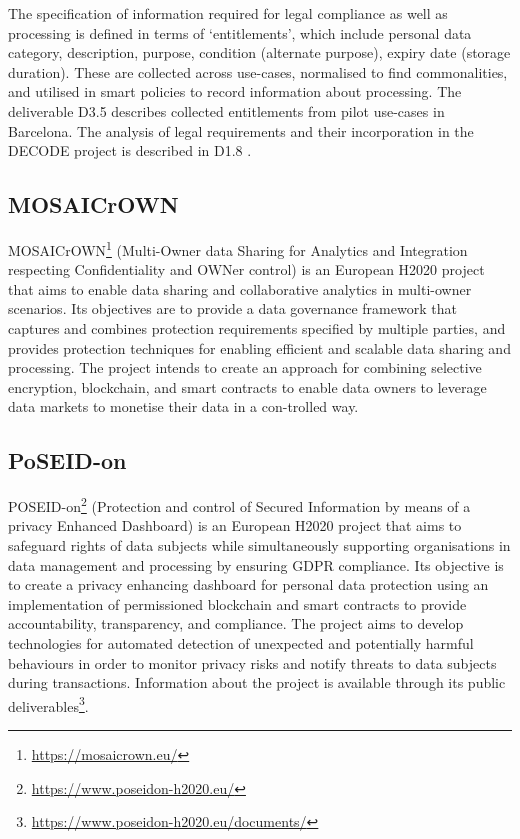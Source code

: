 The specification of information required for legal compliance as well as processing is defined in terms of `entitlements', which include personal data category, description, purpose, condition (alternate purpose), expiry date (storage duration). These are collected across use-cases, normalised to find commonalities, and utilised in smart policies to record information about processing. The deliverable D3.5 \cite{roio_d3.5_2018} describes collected entitlements from pilot use-cases in Barcelona.
The analysis of legal requirements and their incorporation in the DECODE project is described in D1.8 \cite{noauthor_d1.8_2017}.

\subsection*{MOSAICrOWN}
MOSAICrOWN\footnote{\url{https://mosaicrown.eu/}} (Multi-Owner data Sharing for Analytics and Integration respecting Confidentiality and OWNer control) is an European H2020 project that aims to enable data sharing and collaborative analytics in multi-owner scenarios. Its objectives are to provide a data governance framework that captures and combines protection requirements specified by multiple parties, and provides protection techniques for enabling efficient and scalable data sharing and processing.
The project intends to create an approach for combining selective encryption, blockchain, and smart contracts to enable data owners to leverage data markets to monetise their data in a con-trolled way. 

\subsection*{PoSEID-on}
POSEID-on\footnote{\url{https://www.poseidon-h2020.eu/}} (Protection and control of Secured Information by means of a privacy Enhanced Dashboard) is an European H2020 project that aims to safeguard rights of data subjects
while simultaneously supporting organisations in data management and processing by ensuring GDPR compliance.
Its objective is to create a privacy enhancing dashboard for personal data protection using an implementation of permissioned blockchain and smart contracts to provide accountability, transparency, and compliance.
The project aims to develop technologies for automated detection of unexpected and potentially harmful behaviours in order to monitor privacy risks and notify threats to data subjects during transactions.
Information about the project is available through its public deliverables\footnote{\url{https://www.poseidon-h2020.eu/documents/}}.

